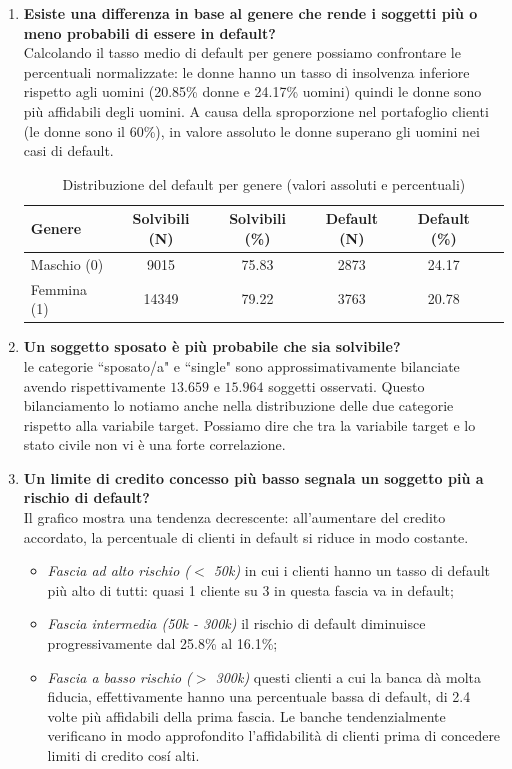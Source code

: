 \documentclass{article}
\begin{document}
\begin{enumerate}
    \item \textbf{Esiste una differenza in base al genere che rende i soggetti pi\`u o meno probabili di essere in default?}\\
    Calcolando il tasso medio di default per genere possiamo confrontare le percentuali normalizzate: le donne hanno un tasso di insolvenza inferiore rispetto agli uomini (20.85\% donne e 24.17\% uomini) quindi le donne sono pi\`u affidabili degli uomini. A causa della sproporzione nel portafoglio clienti (le donne sono il 60\%), in valore assoluto le donne superano gli uomini nei casi di default. 
    \begin{table}[H]
    \centering
    \begin{tabular}{lccccc}
    \toprule
    \textbf{Genere} & \textbf{Solvibili (N)} & \textbf{Solvibili (\%)} & \textbf{Default (N)} & \textbf{Default (\%)}  \\
    \midrule
    Maschio (0) & 9015  & 75.83 & 2873 & 24.17  \\
    Femmina (1) & 14349 & 79.22 & 3763 & 20.78  \\
    \bottomrule
    \end{tabular}
    \caption{Distribuzione del default per genere (valori assoluti e percentuali)}
    \label{tab:default_genere}
    \end{table}

    \item \textbf{Un soggetto sposato \`e pi\`u probabile che sia solvibile?} \\
    le categorie ``sposato/a" e ``single" sono approssimativamente bilanciate avendo rispettivamente $13.659$ e $15.964$ soggetti osservati. Questo bilanciamento lo notiamo anche nella distribuzione delle due categorie rispetto alla variabile target. Possiamo dire che tra la variabile target e lo stato civile non vi \`e una forte correlazione.

    \item \textbf{Un limite di credito concesso pi\`u basso segnala un soggetto pi\`u a rischio di default?}\\
    Il grafico mostra una tendenza decrescente: all'aumentare del credito accordato, la percentuale di clienti in default si riduce in modo costante.
    \begin{itemize}
        \item \textit{Fascia ad alto rischio ($<$ 50k)} in cui i clienti hanno un tasso di default pi\`u alto di tutti: quasi 1 cliente su 3 in questa fascia va in default;
        \item \textit{Fascia intermedia (50k - 300k)} il rischio di default diminuisce progressivamente dal 25.8\% al 16.1\%;
        \item \textit{Fascia a basso rischio ($>$ 300k)} questi clienti a cui la banca d\`a molta fiducia, effettivamente hanno una percentuale bassa di default, di 2.4 volte pi\`u affidabili della prima fascia. Le banche tendenzialmente verificano in modo approfondito l'affidabilit\`a di clienti prima di concedere limiti di credito cos\'i alti.
    \end{itemize}
    

\end{enumerate}
\end{document}
